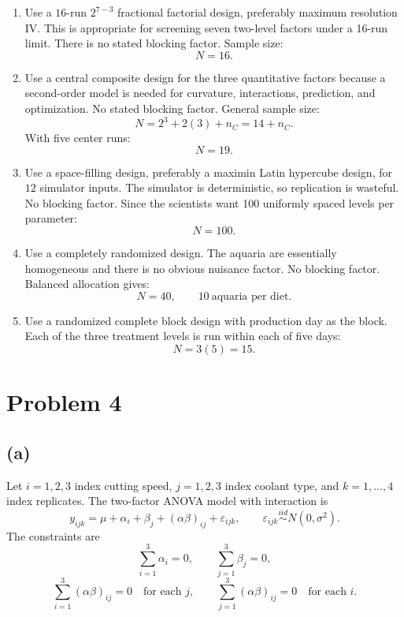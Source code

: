 \documentclass[11pt]{article}
\begin{document}
\begin{enumerate}[label=(\alph*)]
\item Use a \(16\)-run \(2^{7-3}\) fractional factorial design, preferably maximum resolution IV. This is appropriate for screening seven two-level factors under a 16-run limit. There is no stated blocking factor. Sample size:
\[
N=16.
\]

\item Use a central composite design for the three quantitative factors because a second-order model is needed for curvature, interactions, prediction, and optimization. No stated blocking factor. General sample size:
\[
N=2^3+2(3)+n_C=14+n_C.
\]
With five center runs:
\[
N=19.
\]

\item Use a space-filling design, preferably a maximin Latin hypercube design, for \(12\) simulator inputs. The simulator is deterministic, so replication is wasteful. No blocking factor. Since the scientists want 100 uniformly spaced levels per parameter:
\[
N=100.
\]

\item Use a completely randomized design. The aquaria are essentially homogeneous and there is no obvious nuisance factor. No blocking factor. Balanced allocation gives:
\[
N=40,\qquad 10\ \text{aquaria per diet}.
\]

\item Use a randomized complete block design with production day as the block. Each of the three treatment levels is run within each of five days:
\[
N=3(5)=15.
\]
\end{enumerate}

\section*{Problem 4}

\subsection*{(a)}
Let \(i=1,2,3\) index cutting speed, \(j=1,2,3\) index coolant type, and \(k=1,\ldots,4\) index replicates. The two-factor ANOVA model with interaction is
\[
y_{ijk}=\mu+\alpha_i+\beta_j+(\alpha\beta)_{ij}+\varepsilon_{ijk},
\qquad
\varepsilon_{ijk}\stackrel{iid}{\sim}N(0,\sigma^2).
\]
The constraints are
\[
\sum_{i=1}^3\alpha_i=0,\qquad
\sum_{j=1}^3\beta_j=0,
\]
\[
\sum_{i=1}^3(\alpha\beta)_{ij}=0\quad\text{for each }j,\qquad
\sum_{j=1}^3(\alpha\beta)_{ij}=0\quad\text{for each }i.
\]
\end{document}
